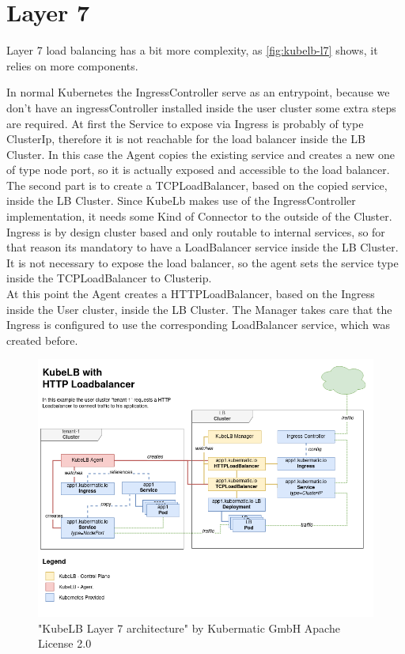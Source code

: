 \section{Layer 7}

Layer 7 load balancing has a bit more complexity, as \autoref{fig:kubelb-l7} shows, it relies on more components.

In normal Kubernetes the IngressController serve as an entrypoint, because we don't have an ingressController installed inside the user cluster some extra steps are required.
At first the Service to expose via Ingress is probably of type ClusterIp, therefore it is not reachable for the load balancer inside the LB Cluster.
In this case the Agent copies the existing service and creates a new one of type node port, so it is actually exposed and accessible to the load balancer.
\\
The second part is to create a TCPLoadBalancer, based on the copied service, inside the LB Cluster.
Since KubeLb makes use of the IngressController implementation, it needs some Kind of Connector to the outside of the Cluster.
Ingress is by design cluster based and only routable to internal services, so for that reason its mandatory to have a LoadBalancer service inside the LB Cluster.
It is not necessary to expose the load balancer, so the agent sets the service type inside the TCPLoadBalancer to Clusterip.
\\
At this point the Agent creates a HTTPLoadBalancer, based on the Ingress inside the User cluster, inside the LB Cluster.
The Manager takes care that the Ingress is configured to use the corresponding LoadBalancer service, which was created before.

\begin{figure}[H]
    \centering
    \includegraphics[width=1\linewidth]{media/06/kubelb-l7}
    \caption{"KubeLB Layer 7 architecture" by Kubermatic GmbH Apache License 2.0}
    \label{fig:kubelb-l7}
\end{figure}

